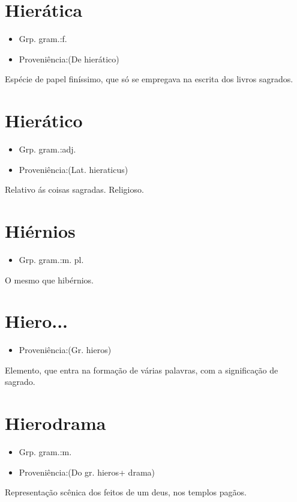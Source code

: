 \documentclass{article}
\begin{document}
\section{Hierática}
\begin{itemize}
\item {Grp. gram.:f.}
\end{itemize}
\begin{itemize}
\item {Proveniência:(De \textunderscore hierático\textunderscore )}
\end{itemize}
Espécie de papel finíssimo, que só se empregava na escrita dos livros sagrados.
\section{Hierático}
\begin{itemize}
\item {Grp. gram.:adj.}
\end{itemize}
\begin{itemize}
\item {Proveniência:(Lat. \textunderscore hieraticus\textunderscore )}
\end{itemize}
Relativo ás coisas sagradas.
Religioso.
\section{Hiérnios}
\begin{itemize}
\item {Grp. gram.:m. pl.}
\end{itemize}
O mesmo que \textunderscore hibérnios\textunderscore .
\section{Hiero...}
\begin{itemize}
\item {Proveniência:(Gr. \textunderscore hieros\textunderscore )}
\end{itemize}
Elemento, que entra na formação de várias palavras, com a significação de \textunderscore sagrado\textunderscore .
\section{Hierodrama}
\begin{itemize}
\item {Grp. gram.:m.}
\end{itemize}
\begin{itemize}
\item {Proveniência:(Do gr. \textunderscore hieros\textunderscore  + \textunderscore drama\textunderscore )}
\end{itemize}
Representação scênica dos feitos de um deus, nos templos pagãos.
\end{document}
